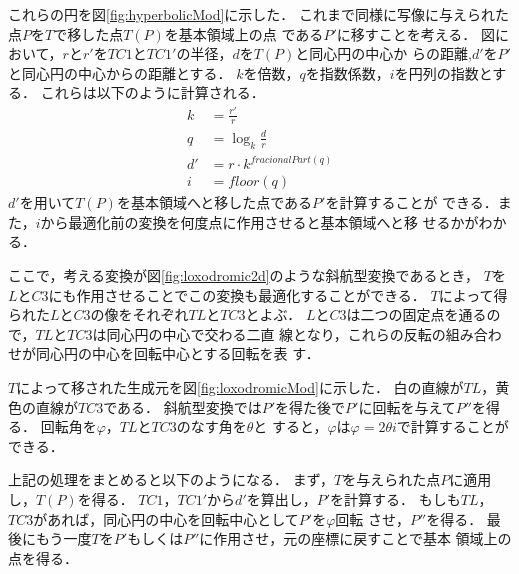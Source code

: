 これらの円を図\ref{fig:hyperbolicMod}に示した．
これまで同様に写像に与えられた点$P$を$T$で移した点$T(P)$を基本領域上の点
である$P'$に移すことを考える．
図において，$r$と$r'$を$TC1$と$TC1'$の半径，$d$を$T(P)$と同心円の中心か
らの距離,$d'$を$P'$と同心円の中心からの距離とする．
$k$を倍数，$q$を指数係数，$i$を円列の指数とする．
これらは以下のように計算される．
 \begin{align*}
  k& = \frac{r'}{r}\\
  q& = \log_{k} \frac{d}{r}\\
  d'& = r \cdot k^{fracionalPart(q)}\\
  i& = floor(q)
 \end{align*}
$d'$を用いて$T(P)$を基本領域へと移した点である$P'$を計算することが
できる．また，$i$から最適化前の変換を何度点に作用させると基本領域へと移
せるかがわかる．

ここで，考える変換が図\ref{fig:loxodromic2d}のような斜航型変換であるとき，
$T$を$L$と$C3$にも作用させることでこの変換も最適化することができる．
$T$によって得られた$L$と$C3$の像をそれぞれ$TL$と$TC3$とよぶ．
$L$と$C3$は二つの固定点を通るので，$TL$と$TC3$は同心円の中心で交わる二直
線となり，これらの反転の組み合わせが同心円の中心を回転中心とする回転を表
す．

$T$によって移された生成元を図\ref{fig:loxodromicMod}に示した．
白の直線が$TL$，黄色の直線が$TC3$である．
斜航型変換では$P'$を得た後で$P'$に回転を与えて$P''$を得る．
回転角を$\varphi$，$TL$と$TC3$のなす角を$\theta$と
すると，$\varphi$は$\varphi = 2 \theta i$で計算することができる．

上記の処理をまとめると以下のようになる．
まず，$T$を与えられた点$P$に適用し，$T(P)$を得る．
$TC1$，$TC1'$から$d'$を算出し，$P'$を計算する．
もしも$TL$，$TC3$があれば，同心円の中心を回転中心として$P'$を$\varphi$回転
させ，$P''$を得る．
最後にもう一度$T$を$P'$もしくは$P''$に作用させ，元の座標に戻すことで基本
領域上の点を得る．


